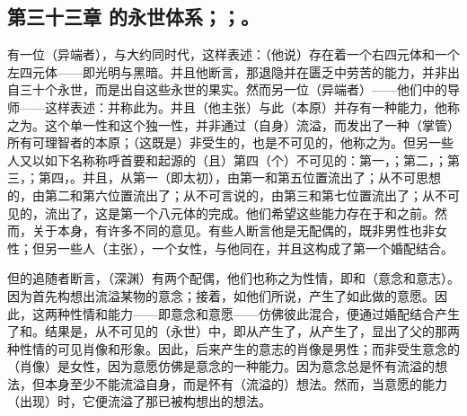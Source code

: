 
\subsection{第三十三章 的永世体系；；。}

有一位（异端者），与大约同时代，这样表述：（他说）存在着一个右四元体和一个左四元体——即光明与黑暗。并且他断言，那退隐并在匮乏中劳苦的能力，并非出自三十个永世，而是出自这些永世的果实。然而另一位（异端者）——他们中的导师——这样表述：并称此为。并且（他主张）与此（本原）并存有一种能力，他称之为。这个单一性和这个独一性，并非通过（自身）流溢，而发出了一种（掌管）所有可理智者的本原；（这既是）非受生的，也是不可见的，他称之为。但另一些人又以如下名称称呼首要和起源的（且）第四（个）不可见的：第一，；第二，；第三，；第四，。并且，从第一（即太初），由第一和第五位置流出了；从不可思想的，由第二和第六位置流出了；从不可言说的，由第三和第七位置流出了；从不可见的，流出了，这是第一个八元体的完成。他们希望这些能力存在于和之前。然而，关于本身，有许多不同的意见。有些人断言他是无配偶的，既非男性也非女性；但另一些人（主张），一个女性，与他同在，并且这构成了第一个婚配结合。\par

但的追随者断言，（深渊）有两个配偶，他们也称之为性情，即和（意念和意志）。因为首先构想出流溢某物的意念；接着，如他们所说，产生了如此做的意愿。因此，这两种性情和能力——即意念和意愿——仿佛彼此混合，便通过婚配结合产生了和。结果是，从不可见的（永世）中，即从产生了，从产生了，显出了父的那两种性情的可见肖像和形象。因此，后来产生的意志的肖像是男性；而非受生意念的（肖像）是女性，因为意愿仿佛是意念的一种能力。因为意念总是怀有流溢的想法，但本身至少不能流溢自身，而是怀有（流溢的）想法。然而，当意愿的能力（出现）时，它便流溢了那已被构想出的想法。\par


